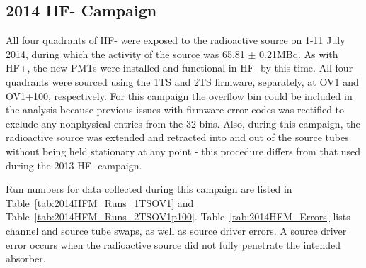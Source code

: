 \subsection{2014 HF- Campaign}
All four quadrants of HF- were exposed to the radioactive source on 1-11 July
2014, during which the activity of the source was 65.81 $\pm$ 0.21\unit{MBq}.
As with HF+, the new PMTs were installed and functional in HF- by this time.
All four quadrants were sourced using the 1TS and 2TS firmware, separately, at
OV1 and OV1+100, respectively. For this campaign the overflow bin could be
included in the analysis because previous issues with firmware error codes was
rectified to exclude any nonphysical entries from the 32 bins. Also, during
this campaign, the radioactive source was extended and retracted into and out
of the source tubes without being held stationary at any point - this
procedure differs from that used during the 2013 HF- campaign.

Run numbers for data collected during this campaign are listed in
Table~\ref{tab:2014HFM_Runs_1TSOV1} and Table~\ref{tab:2014HFM_Runs_2TSOV1p100}.
Table~\ref{tab:2014HFM_Errors} lists channel and source tube swaps, as well as source driver errors.
A source driver error occurs when the radioactive source did not fully penetrate
the intended absorber.


